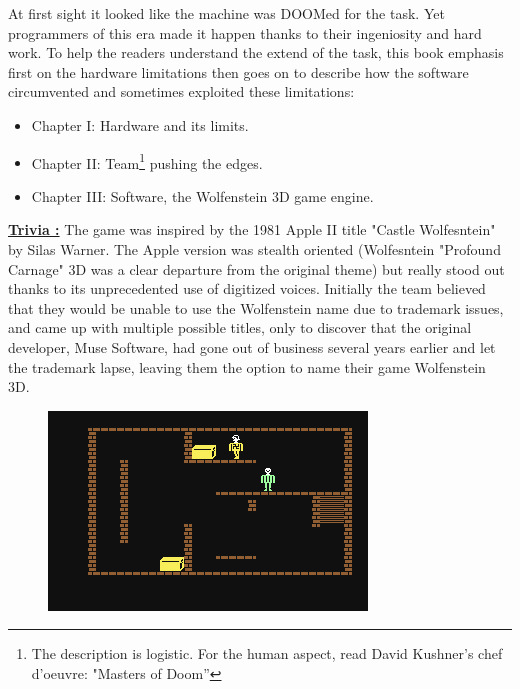 At first sight it looked like the machine was DOOMed for the task. Yet programmers of this era made it happen thanks to their ingeniosity and hard work. To help the readers understand the extend of the task, this book emphasis first on the hardware limitations then goes on to describe how the software circumvented and sometimes exploited these limitations:
\begin{itemize}
\item Chapter I: Hardware and its limits.
\item Chapter II: Team\footnote{The description is logistic. For the human aspect, read David Kushner's chef d'oeuvre: "Masters of Doom''} pushing the edges.
\item Chapter III: Software, the Wolfenstein 3D game engine.
\end{itemize}
\par
\textbf{\underline{Trivia :}} The game was inspired by the 1981 Apple II title "Castle Wolfesntein" by Silas Warner. The Apple version was stealth oriented (Wolfesntein "Profound Carnage" 3D was a clear departure from the original theme) but really stood out thanks to its unprecedented use of digitized voices. Initially the team believed that they would be unable to use the Wolfenstein name due to trademark issues, and came up with multiple possible titles, only to discover that the original developer, Muse Software, had gone out of business several years earlier and let the trademark lapse, leaving them the option to name their game Wolfenstein 3D.

 \begin{figure}[H]
\centering
      \includegraphics[width=\textwidth]{imgs/CastleWolfensteinC64.png}
\end{figure}

